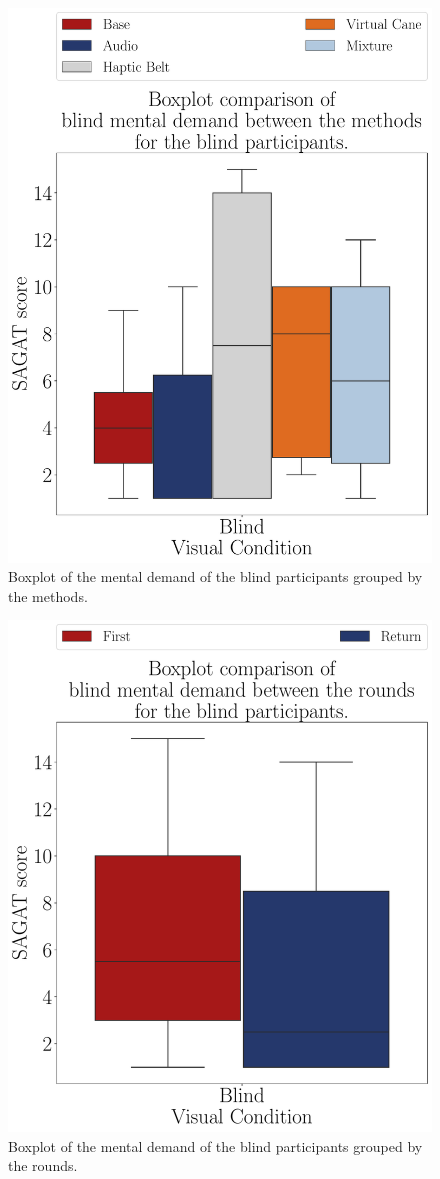 \begin{figure}[!htb]
    \centering
    \includegraphics[width = 0.75\linewidth]{3 - Resultados/Figuras/boxplot_md_blind_scene.pdf}
    \caption{Boxplot of the mental demand of the blind participants grouped by the methods.}
    \label{fig:boxplot_md_blind_scene}
\end{figure}    
\begin{figure}[!htb]
    \centering
    \includegraphics[width = 0.75\linewidth]{3 - Resultados/Figuras/boxplot_md_blind_rounds.pdf}
    \caption{Boxplot of the mental demand of the blind participants grouped by the rounds.}
    \label{fig:boxplot_md_blind_rounds}
\end{figure}

